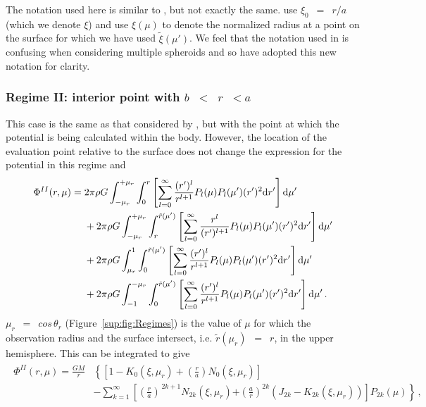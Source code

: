 \documentclass[11pt, oneside]{article}   	%
\begin{document}
The notation used here is similar to \cite{Kong2013}, but not exactly the same. \cite{Kong2013} use $\xi_0$~$=$~$r/a$ (which we denote $\xi$) and use $\xi(\mu)$ to denote the normalized radius at a point on the surface for which we have used $\tilde{\xi}(\mu')$.
We feel that the notation used in \cite{Kong2013} is confusing when considering multiple spheroids and so have adopted this new notation for clarity.

\subsubsection{Regime II: interior point with $b$~$<$~$r$~$<a$}
\label{HUG:sec:R2}

This case is the same as that considered by \cite{Kong2013}, but with the point at which the potential is being calculated within the body.
However, the location of the evaluation point relative to the surface does not change the expression for the potential in this regime and
%
\begin{align}
\begin{aligned}
 \Phi^{II}(r,\mu) = {}  & 2\pi \rho G \int_{-\mu_r}^{+\mu_r} \int_0^r \left [ \sum_{l=0}^{\infty} \frac{(r')^l}{r^{l+1}} P_l(\mu)P_l(\mu') (r')^2 {\rm d}r' \right ] {\rm d}\mu' \\
& + 2\pi \rho G \int_{-\mu_r}^{+\mu_r} \int_{r}^{\tilde{r}(\mu')} \left [ \sum_{l=0}^{\infty} \frac{r^l}{(r')^{l+1}} P_l(\mu)P_l(\mu') (r')^2 {\rm d}r' \right ] {\rm d}\mu' \\
& +2\pi \rho G \int_{\mu_r}^{1} \int_0^{\tilde{r}(\mu')} \left [ \sum_{l=0}^{\infty} \frac{(r')^l}{r^{l+1}} P_l(\mu)P_l(\mu') (r')^2 {\rm d}r' \right ] {\rm d}\mu' \\
& +2\pi \rho G \int_{-1}^{-\mu_r} \int_0^{\tilde{r}(\mu')} \left [ \sum_{l=0}^{\infty} \frac{(r')^l}{r^{l+1}} P_l(\mu)P_l(\mu') (r')^2 {\rm d}r' \right ] {\rm d}\mu' \,. 
\label{HUG:eqn:Kong15}
\end{aligned}
\end{align}
%
$\mu_r$~$=$~$cos\, \theta_r$ (Figure~\ref{sup:fig:Regimes}) is the value of $\mu$ for which the observation radius and the surface intersect, i.e. $\tilde{r}(\mu_r)$~$=$~$r$, in the upper hemisphere.
This can be integrated to give
%
\begin{align}
\begin{aligned}
\Phi^{II}(r,\mu) = \frac{G M}{r}  {} & \left \{ \left [ 1 - K_0(\xi, \mu_r) + \left ( \frac{r}{a} \right ) N_0 (\xi, \mu_r) \right ] \right . \\
& \left . - \sum_{k=1}^{\infty} \left [   \left (\frac{r}{a} \right )^{ \, 2 k + 1} N_{2k}(\xi, \mu_r) \right . \right. \left.\left.  + \left (\frac{a}{r} \right )^{2 k} (J_{2k}- K_{2k}(\xi, \mu_r) )\right ] P_{2k}(\mu) \right \} \,,
\label{HUG:eqn:RegII}
\end{aligned}
\end{align}
\end{document}
